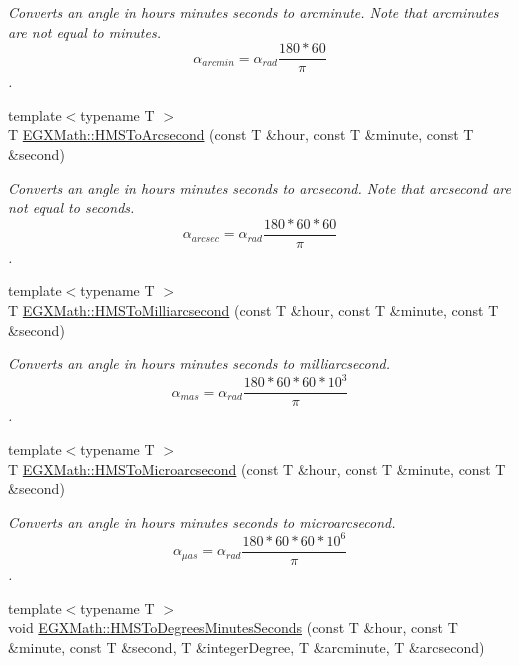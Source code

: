 \begin{DoxyCompactItemize}
\begin{DoxyCompactList}\small\item\em Converts an angle in hours minutes seconds to arcminute. Note that arcminutes are not equal to minutes. \[\alpha_{arcmin}=\alpha_{rad}\frac{180 * 60}{\pi}\]. \end{DoxyCompactList}\item 
{\footnotesize template$<$typename T $>$ }\\T \mbox{\hyperlink{group___e_g_x_math-_conversions-_angle_conversions-_h_m_s_ga0eb401fd061fcc28ed22ddc869938bea}{E\+G\+X\+Math\+::\+H\+M\+S\+To\+Arcsecond}} (const T \&hour, const T \&minute, const T \&second)
\begin{DoxyCompactList}\small\item\em Converts an angle in hours minutes seconds to arcsecond. Note that arcsecond are not equal to seconds. \[\alpha_{arcsec}=\alpha_{rad}\frac{180 * 60 * 60}{\pi}\]. \end{DoxyCompactList}\item 
{\footnotesize template$<$typename T $>$ }\\T \mbox{\hyperlink{group___e_g_x_math-_conversions-_angle_conversions-_h_m_s_ga08189ea113f78c71e3d30055c757604a}{E\+G\+X\+Math\+::\+H\+M\+S\+To\+Milliarcsecond}} (const T \&hour, const T \&minute, const T \&second)
\begin{DoxyCompactList}\small\item\em Converts an angle in hours minutes seconds to milliarcsecond. \[\alpha_{mas}=\alpha_{rad}\frac{180 * 60 * 60 * 10^3}{\pi}\]. \end{DoxyCompactList}\item 
{\footnotesize template$<$typename T $>$ }\\T \mbox{\hyperlink{group___e_g_x_math-_conversions-_angle_conversions-_h_m_s_ga5d91ade4a1aaf641f9483e840e701446}{E\+G\+X\+Math\+::\+H\+M\+S\+To\+Microarcsecond}} (const T \&hour, const T \&minute, const T \&second)
\begin{DoxyCompactList}\small\item\em Converts an angle in hours minutes seconds to microarcsecond. \[\alpha_{\mu as}=\alpha_{rad}\frac{180 * 60 * 60 * 10^6}{\pi}\]. \end{DoxyCompactList}\item 
{\footnotesize template$<$typename T $>$ }\\void \mbox{\hyperlink{group___e_g_x_math-_conversions-_angle_conversions-_h_m_s_ga7f694aec9b3e7cc9d94d510e27e4403f}{E\+G\+X\+Math\+::\+H\+M\+S\+To\+Degrees\+Minutes\+Seconds}} (const T \&hour, const T \&minute, const T \&second, T \&integer\+Degree, T \&arcminute, T \&arcsecond)

\end{DoxyCompactItemize}
